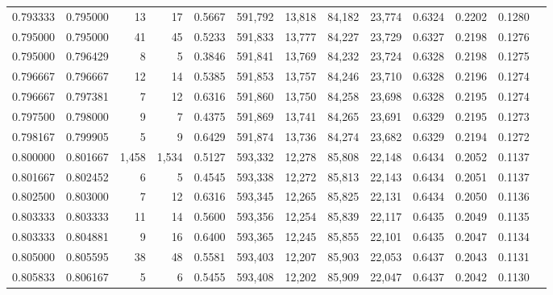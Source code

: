 \begin{tabular}{rrrrrrrrrrrrr}
0.793333 & 0.795000 &     13 &    17 &                                     0.5667 & 591,792 &  13,818 &  84,182 &  23,774 & 0.6324 & 0.2202 & 0.1280 \\
0.795000 & 0.795000 &     41 &    45 &                                     0.5233 & 591,833 &  13,777 &  84,227 &  23,729 & 0.6327 & 0.2198 & 0.1276 \\
0.795000 & 0.796429 &      8 &     5 &                                     0.3846 & 591,841 &  13,769 &  84,232 &  23,724 & 0.6328 & 0.2198 & 0.1275 \\
0.796667 & 0.796667 &     12 &    14 &                                     0.5385 & 591,853 &  13,757 &  84,246 &  23,710 & 0.6328 & 0.2196 & 0.1274 \\
0.796667 & 0.797381 &      7 &    12 &                                     0.6316 & 591,860 &  13,750 &  84,258 &  23,698 & 0.6328 & 0.2195 & 0.1274 \\
0.797500 & 0.798000 &      9 &     7 &                                     0.4375 & 591,869 &  13,741 &  84,265 &  23,691 & 0.6329 & 0.2195 & 0.1273 \\
0.798167 & 0.799905 &      5 &     9 &                                     0.6429 & 591,874 &  13,736 &  84,274 &  23,682 & 0.6329 & 0.2194 & 0.1272 \\
0.800000 & 0.801667 &  1,458 & 1,534 &                                     0.5127 & 593,332 &  12,278 &  85,808 &  22,148 & 0.6434 & 0.2052 & 0.1137 \\
0.801667 & 0.802452 &      6 &     5 &                                     0.4545 & 593,338 &  12,272 &  85,813 &  22,143 & 0.6434 & 0.2051 & 0.1137 \\
0.802500 & 0.803000 &      7 &    12 &                                     0.6316 & 593,345 &  12,265 &  85,825 &  22,131 & 0.6434 & 0.2050 & 0.1136 \\
0.803333 & 0.803333 &     11 &    14 &                                     0.5600 & 593,356 &  12,254 &  85,839 &  22,117 & 0.6435 & 0.2049 & 0.1135 \\
0.803333 & 0.804881 &      9 &    16 &                                     0.6400 & 593,365 &  12,245 &  85,855 &  22,101 & 0.6435 & 0.2047 & 0.1134 \\
0.805000 & 0.805595 &     38 &    48 &                                     0.5581 & 593,403 &  12,207 &  85,903 &  22,053 & 0.6437 & 0.2043 & 0.1131 \\
0.805833 & 0.806167 &      5 &     6 &                                     0.5455 & 593,408 &  12,202 &  85,909 &  22,047 & 0.6437 & 0.2042 & 0.1130 \\

\end{tabular}
